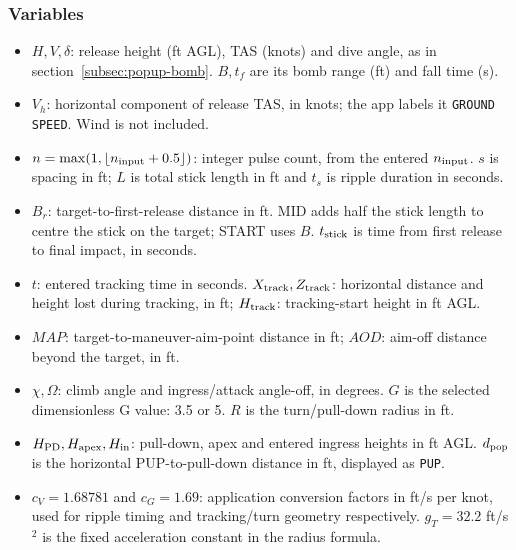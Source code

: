 \documentclass[10pt,a4paper]{amsart}
\begin{document}
\subsubsection*{Variables}
\begin{itemize}
\setlength{\itemsep}{0pt}
\setlength{\parsep}{0pt}
\item $H,V,\delta$: release height (ft AGL), TAS (knots) and dive
angle, as in section~\ref{subsec:popup-bomb}.
$B,t_f$ are its bomb range (ft) and fall time (s).
\item $V_h$: horizontal component of release TAS, in knots;
the app labels it \texttt{GROUND SPEED}. Wind is not included.
\item $n=\max(1,\lfloor n_{\rm input}+0.5\rfloor)$: integer pulse count,
from the entered $n_{\rm input}$. $s$ is spacing in ft;
$L$ is total stick length in ft and $t_s$ is ripple duration in seconds.
\item $B_r$: target-to-first-release distance in ft. MID adds half
the stick length to centre the stick on the target; START uses $B$.
$t_{\rm stick}$ is time from first release to final impact, in seconds.
\item $t$: entered tracking time in seconds.
$X_{\rm track},Z_{\rm track}$: horizontal distance and height lost
during tracking, in ft; $H_{\rm track}$: tracking-start height in ft AGL.
\item $MAP$: target-to-maneuver-aim-point distance in ft;
$AOD$: aim-off distance beyond the target, in ft.
\item $\chi,\Omega$: climb angle and ingress/attack angle-off, in degrees.
$G$ is the selected dimensionless G value: 3.5 or 5.
$R$ is the turn/pull-down radius in ft.
\item $H_{\rm PD},H_{\rm apex},H_{\rm in}$: pull-down, apex and
entered ingress heights in ft AGL. $d_{\rm pop}$ is the horizontal
PUP-to-pull-down distance in ft, displayed as \texttt{PUP}.
\item $c_V=1.68781$ and $c_G=1.69$: application conversion factors
in ft/s per knot, used for ripple timing and tracking/turn geometry
respectively. $g_T=32.2$ ft/s$^2$ is the fixed acceleration constant
in the radius formula.
\end{itemize}
\end{document}
